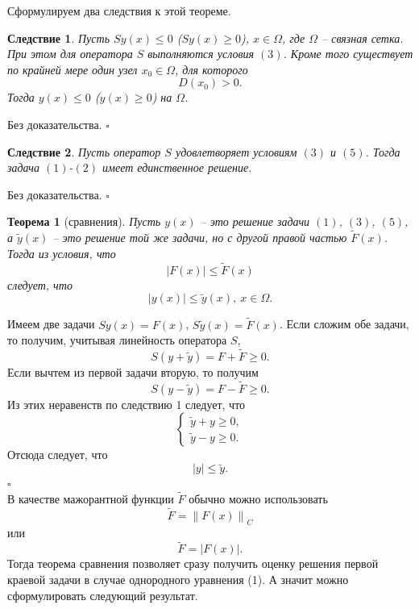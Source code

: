 \documentclass[a4paper, 12pt]{report}
\numberwithin{equation}{section}
\newenvironment{Proof} %
{\par\noindent{$\blacklozenge$}} %
{\hfill$\scriptstyle\square$}
\renewcommand{\leq}{\leqslant}
\renewcommand{\geq}{\geqslant}
\newcommand\Norm[1]{\left\| #1 \right\|}
\newtheorem*{theorem}{Теорема}
\newtheorem*{cor}{Следствие}
\begin{document}
	Сформулируем два следствия к этой теореме.
	\begin{cor}
		Пусть $Sy(x) \leq 0$ ($Sy(x) \geq 0$), $x \in \Omega$, где $\Omega$ -- связная сетка. При этом для оператора $S$ выполняются условия $(3)$. Кроме того существует по крайней мере один узел $x_0 \in \Omega$, для которого \begin{equation}
			D(x_0) > 0.
		\end{equation}
		Тогда $y(x) \leq 0$ ($y(x)\geq 0$) на $\Omega$.
	\end{cor}
	\begin{Proof}
		Без доказательства.
	\end{Proof}
	\begin{cor}
		Пусть оператор $S$ удовлетворяет условиям $(3)$ и $(5)$. Тогда задача $(1)$-$(2)$ имеет единственное решение.
	\end{cor}
	\begin{Proof}
		Без доказательства.
	\end{Proof}
	\begin{theorem} [сравнения]
		Пусть $y(x)$ -- это решение задачи $(1)$, $(3)$, $(5)$, а $\tilde y(x)$ -- это решение той же задачи, но с другой правой частью $\tilde F (x)$. Тогда из условия, что \begin{equation*}
			|F(x)| \leq \tilde F(x)
		\end{equation*}
		следует, что \begin{equation*}
			|y(x)|\leq \tilde y(x),\ x \in \Omega.
		\end{equation*}
	\end{theorem}
	\begin{Proof}
		Имеем две задачи $Sy(x) = F(x)$, $S \tilde y(x) = \tilde F(x)$. Если сложим обе задачи, то получим, учитывая линейность оператора $S$,
		$$S(y + \tilde y) = F + \tilde F \geq 0.$$
		Если вычтем из первой задачи вторую, то получим
		$$S(y - \tilde y) = F - \tilde F \geq 0.$$
		Из этих неравенств по следствию 1 следует, что $$\begin{cases}
			\tilde y + y \geq 0,\\ \tilde y - y \geq 0.
		\end{cases}$$
		Отсюда следует, что
		$$|y|\leq \tilde y.$$
	\end{Proof}\\
	В качестве мажорантной функции $\tilde F$ обычно можно использовать 
	$$\tilde F = \Norm{F(x)}_C$$
	или
	$$\tilde F = |F(x)|.$$
	Тогда теорема сравнения позволяет сразу получить оценку решения первой краевой задачи в случае однородного уравнения (1). А значит можно сформулировать следующий результат.
\end{document}
